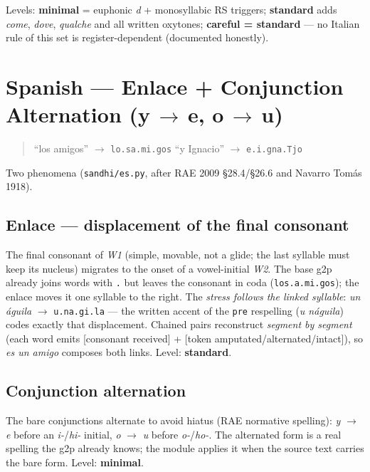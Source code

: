 \documentclass[11pt,a4paper]{report}
\newcommand{\smp}[1]{\texttt{#1}}          %
\begin{document}
Levels: \textbf{minimal} = euphonic \emph{d} + monosyllabic RS triggers;
\textbf{standard} adds \emph{come}, \emph{dove}, \emph{qualche} and all
written oxytones; \textbf{careful = standard} — no Italian rule of this set
is register-dependent (documented honestly).

\chapter{Spanish — Enlace + Conjunction Alternation (y\,$\rightarrow$\,e, o\,$\rightarrow$\,u)}
\label{chap:es}

\begin{quote}\large``los amigos'' $\rightarrow$ \smp{lo.sa.mi.gos} \qquad\qquad ``y Ignacio'' $\rightarrow$ \smp{e.i.gna.Tjo}\end{quote}

\noindent Two phenomena (\smp{sandhi/es.py}, after RAE 2009 \S28.4/\S26.6
and Navarro Tom\'as 1918).

\section{Enlace — displacement of the final consonant}

The final consonant of \emph{W1} (simple, movable, not a glide; the last
syllable must keep its nucleus) migrates to the onset of a vowel-initial
\emph{W2}. The base g2p already joins words with \smp{.} but leaves the
consonant in coda (\smp{los.a.mi.gos}); the enlace moves it one syllable to
the right. The \emph{stress follows the linked syllable}: \emph{un
\'aguila} $\rightarrow$ \smp{u.na.gi.la} — the written accent of the
\smp{pre} respelling (\emph{u n\'aguila}) codes exactly that displacement.
Chained pairs reconstruct \emph{segment by segment} (each word emits
[consonant received] + [token amputated/alternated/intact]), so
\emph{es un amigo} composes both links. Level: \textbf{standard}.

\section{Conjunction alternation}

The bare conjunctions alternate to avoid hiatus (RAE normative spelling):
\emph{y} $\rightarrow$ \emph{e} before an \emph{i-}/\emph{hi-} initial,
\emph{o} $\rightarrow$ \emph{u} before \emph{o-}/\emph{ho-}. The alternated
form is a real spelling the g2p already knows; the module applies it when
the source text carries the bare form. Level: \textbf{minimal}.
\end{document}
